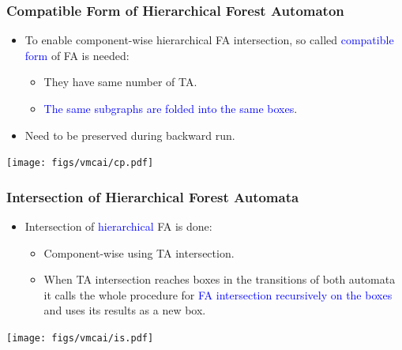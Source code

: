 \documentclass{beamer}
\newcommand{\hlbl}[1]{\textcolor{blue}{#1}}
\begin{document}
\begin{frame}
\frametitle{Compatible Form of Hierarchical Forest Automaton}
	
		   	\begin{itemize}
				\item To enable component-wise hierarchical FA intersection,
					so called \hlbl{compatible form} of FA is needed:
				\begin{itemize}
					\item They have same number of TA.
					\item \hlbl{The same subgraphs are folded into the same boxes}.
				\end{itemize}
				\item Need to be preserved during backward run.
			\end{itemize}

	\begin{center}
		\texttt{[image: figs/vmcai/cp.pdf]}
	\end{center}

\end{frame}

\begin{frame}
\frametitle{Intersection of Hierarchical Forest Automata}

  	\begin{itemize}
	\item Intersection of \hlbl{hierarchical} FA is done:
		  	\begin{itemize}
				\item Component-wise using TA intersection.
				\item When TA intersection reaches boxes in the transitions of both automata it calls the whole
					procedure for \hlbl{FA intersection recursively on the boxes} and uses its results as a new box.
			\end{itemize}
	\end{itemize}
	\begin{center}
		\texttt{[image: figs/vmcai/is.pdf]}
	\end{center}

\end{frame}
\end{document}
